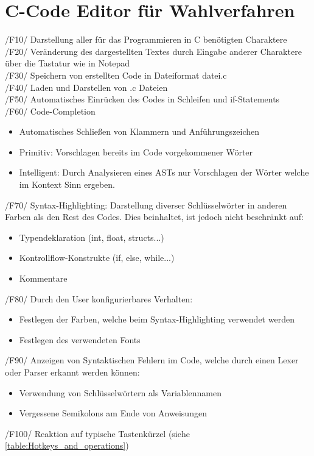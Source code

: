 \documentclass[a4paper]{scrreprt}
\begin{document}
\section{C-Code Editor für Wahlverfahren}
/F10/ Darstellung aller für das Programmieren in C benötigten Charaktere \\
/F20/ Veränderung des dargestellten Textes durch Eingabe anderer Charaktere über die  Tastatur wie in Notepad \\
/F30/ Speichern von erstellten Code in Dateiformat datei.c \\
/F40/ Laden und Darstellen von .c Dateien  \\
/F50/ Automatisches Einrücken des Codes in Schleifen und if-Statements \\
/F60/ Code-Completion
\begin{itemize}
\item Automatisches Schließen von Klammern und Anführungszeichen
\item Primitiv: Vorschlagen bereits im Code vorgekommener Wörter
\item Intelligent: Durch Analysieren eines ASTs nur Vorschlagen der Wörter welche im Kontext Sinn ergeben.
\end{itemize}
/F70/ Syntax-Highlighting: Darstellung diverser Schlüsselwörter in anderen Farben als den Rest des Codes. Dies beinhaltet, ist jedoch nicht beschränkt auf: 
\begin{itemize}
\item Typendeklaration (int, float, structs...)
\item Kontrollflow-Konstrukte (if, else, while...)
\item Kommentare
\end{itemize}
/F80/ Durch den User konfigurierbares Verhalten:
\begin{itemize}
\item Festlegen der Farben, welche beim Syntax-Highlighting verwendet werden
\item Festlegen des verwendeten Fonts
\end{itemize}
/F90/ Anzeigen von Syntaktischen Fehlern im Code, welche durch einen Lexer oder Parser erkannt werden können: 
\begin{itemize}
\item Verwendung von Schlüsselwörtern als Variablennamen 
\item Vergessene Semikolons am Ende von Anweisungen
\end{itemize}
/F100/ Reaktion auf typische Tastenkürzel (siehe \ref{table:Hotkeys_and_operations})\\
\end{document}
